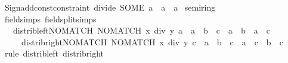 \begin{isabellebody}
%
\isadelimML
\isanewline
%
\endisadelimML
%
\isatagML
{}\isamarkupfalse%
\ {\isacartoucheopen}Sign{\isachardot}{\kern0pt}add{\isacharunderscore}{\kern0pt}const{\isacharunderscore}{\kern0pt}constraint\ {\isacharparenleft}{\kern0pt}\isactrlconstUNDERSCOREname {\isasymopen}divide{\isasymclose}{\isacharcomma}{\kern0pt}\ SOME\ \isactrltyp {\isasymopen}{\isacharprime}{\kern0pt}a\ {\isasymRightarrow}\ {\isacharprime}{\kern0pt}a\ {\isasymRightarrow}\ {\isacharprime}{\kern0pt}a{\isasymclose}{\isacharparenright}{\kern0pt}{\isacartoucheclose}%
\endisatagML
{\isafoldML}%
%
\isadelimML
\isanewline
%
\endisadelimML
\isanewline
{}\isamarkupfalse%
\ semiring\isanewline
{}\isanewline
\isanewline
{}\isamarkupfalse%
\ {\isacharbrackleft}{\kern0pt}field{\isacharunderscore}{\kern0pt}simps{\isacharcomma}{\kern0pt}\ field{\isacharunderscore}{\kern0pt}split{\isacharunderscore}{\kern0pt}simps{\isacharbrackright}{\kern0pt}{\isacharcolon}{\kern0pt}\isanewline
\ \ \ distrib{\isacharunderscore}{\kern0pt}left{\isacharunderscore}{\kern0pt}NO{\isacharunderscore}{\kern0pt}MATCH{\isacharcolon}{\kern0pt}\ {\isachardoublequoteopen}NO{\isacharunderscore}{\kern0pt}MATCH\ {\isacharparenleft}{\kern0pt}x\ div\ y{\isacharparenright}{\kern0pt}\ a\ {\isasymLongrightarrow}\ a\ {\isacharasterisk}{\kern0pt}\ {\isacharparenleft}{\kern0pt}b\ {\isacharplus}{\kern0pt}\ c{\isacharparenright}{\kern0pt}\ {\isacharequal}{\kern0pt}\ a\ {\isacharasterisk}{\kern0pt}\ b\ {\isacharplus}{\kern0pt}\ a\ {\isacharasterisk}{\kern0pt}\ c{\isachardoublequoteclose}\isanewline
\ \ \ \ \ distrib{\isacharunderscore}{\kern0pt}right{\isacharunderscore}{\kern0pt}NO{\isacharunderscore}{\kern0pt}MATCH{\isacharcolon}{\kern0pt}\ {\isachardoublequoteopen}NO{\isacharunderscore}{\kern0pt}MATCH\ {\isacharparenleft}{\kern0pt}x\ div\ y{\isacharparenright}{\kern0pt}\ c\ {\isasymLongrightarrow}\ {\isacharparenleft}{\kern0pt}a\ {\isacharplus}{\kern0pt}\ b{\isacharparenright}{\kern0pt}\ {\isacharasterisk}{\kern0pt}\ c\ {\isacharequal}{\kern0pt}\ a\ {\isacharasterisk}{\kern0pt}\ c\ {\isacharplus}{\kern0pt}\ b\ {\isacharasterisk}{\kern0pt}\ c{\isachardoublequoteclose}\isanewline
%
\isadelimproof
\ \ %
\endisadelimproof
%
\isatagproof
{}\isamarkupfalse%
\ {\isacharparenleft}{\kern0pt}rule\ distrib{\isacharunderscore}{\kern0pt}left\ distrib{\isacharunderscore}{\kern0pt}right{\isacharparenright}{\kern0pt}{\isacharplus}{\kern0pt}%
\endisatagproof
{\isafoldproof}%
%
\isadelimproof
\isanewline
%
\endisadelimproof
\isanewline
{}\isamarkupfalse%

\end{isabellebody}
